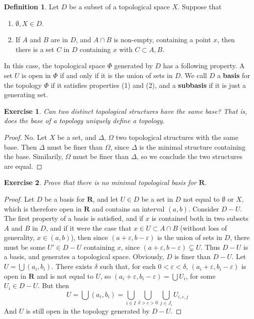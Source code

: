 \documentclass{report}
\theoremstyle{plain}
\newtheorem{exercise}{Exercise}[section]
\theoremstyle{definition}
\newtheorem*{defi}{Definition}
\newenvironment{definition}
    {\begin{samepage}\begin{framed}\begin{defi}}
    {\end{defi}\end{framed}\end{samepage}}
\begin{document}
\begin{definition}
    Let $D$ be a subset of a topological space $X$. Suppose that
    \begin{enumerate}
        \item $\emptyset, X \in D$.
        \item If $A$ and $B$ are in $D$, and $A \cap B$ is non-empty, containing a point $x$, then there is a set $C$ in $D$ containing $x$ with $C \subset A, B$.
    \end{enumerate}
    In this case, the topological space $\Phi$ generated by $D$ has a following property. A set $U$ is open in $\Phi$ if and only if it is the union of sets in $D$. We call $D$ a {\bf basis} for the topology $\Phi$ if it satisfies properties (1) and (2), and a {\bf subbasis} if it is just a generating set.
\end{definition}

\begin{exercise}
    Can two distinct topological structures have the same base? That is, does the base of a topology uniquely define a topology.
\end{exercise}
\begin{proof}
    No. Let $X$ be a set, and $\Delta$, $\Omega$ two topological structures with the same base. Then $\Delta$ must be finer than $\Omega$, since $\Delta$ is the minimal structure containing the base. Similarily, $\Omega$ must be finer than $\Delta$, so we conclude the two structures are equal.
\end{proof}

\begin{exercise}
    Prove that there is no minimal topological basis for $\mathbf{R}$.
\end{exercise}
\begin{proof}
    Let $D$ be a basis for $\mathbf{R}$, and let $U \in D$ be a set in $D$ not equal to $\emptyset$ or $X$, which is therefore open in $\mathbf{R}$ and contains an interval $(a,b)$. Consider $D - U$. The first property of a basis is satisfied, and if $x$ is contained both in two subsets $A$ and $B$ in $D$, and if it were the case that $x \in U \subset A \cap B$ (without loss of generality, $x \in (a,b)$), then since $(a + \varepsilon,b - \varepsilon)$ is the union of sets in $D$, there must be some $U' \in D - U$ containing $x$, since $(a + \varepsilon, b - \varepsilon) \subsetneq U$. Thus $D - U$ is a basis, and generates a topological space. Obviously, $D$ is finer than $D -U$. Let $U = \bigcup (a_i, b_i)$. There exists $\delta$ such that, for each $0 < \varepsilon < \delta$, $(a_i + \varepsilon, b_i - \varepsilon)$ is open in $\mathbf{R}$ and is not equal to $U$, so $(a_i + \varepsilon, b_i - \varepsilon) = \bigcup U_i$, for some $U_i \in D - U$. But then
    \[ U = \bigcup (a_i, b_i) = \bigcup_{i \in I} \bigcup_{\delta > \varepsilon > 0} \bigcup_{j \in J_i} U_{i,\varepsilon,j} \]
    And $U$ is still open in the topology generated by $D - U$.
\end{proof}
\end{document}
